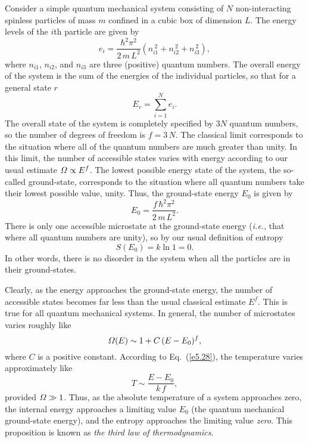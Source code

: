 Consider a simple quantum mechanical system consisting of $N$ non-interacting 
spinless particles of mass $m$ confined in a cubic box of dimension $L$. 
The energy levels of the $i$th particle are given by
\begin{equation}
e_i = \frac{\hbar^2 \pi^2}{2\,m \,L^2} \left(n_{i1}^{~2}+n_{i2}^{~2}+ n_{i3}^{~2}\right),
\end{equation}
where $n_{i1}$, $n_{i2}$, and $n_{i3}$ are three (positive) quantum numbers. The 
overall energy of the system is the sum of the energies of the individual particles,
so that for a general state $r$
\begin{equation}
E_r = \sum_{i=1}^N e_i.
\end{equation}
The overall state of the system is completely
specified by $3N$ quantum  numbers, so the number
of degrees of freedom is $f=3\,N$. The classical limit corresponds to the situation
where all of the quantum numbers are much greater than unity. In this limit, the
number of accessible states varies with energy according to our usual estimate
${\mit\Omega} \propto E^f$. The lowest possible energy state of the system, the 
so-called ground-state, corresponds to the situation where all quantum numbers
take their lowest possible value, unity. Thus, the ground-state energy $E_0$ is
given by 
\begin{equation}
E_0 = \frac{ f\,\hbar^2 \pi^2}{2\,m\, L^2}.
\end{equation}
There is only one accessible microstate at the ground-state energy ({\em i.e.},
that where all quantum numbers are unity), so by our usual definition of
entropy
\begin{equation}
S(E_0) = k\ln 1 = 0.
\end{equation}
In other words, there is no disorder in the system when all the particles are in their
ground-states. 

Clearly, as the energy approaches  the ground-state energy,
the number of accessible states becomes far less than
the usual classical estimate $E^f$. This is true for all quantum mechanical systems.
In general, the number of microstates
varies roughly like
\begin{equation}
{\mit\Omega}(E) \sim 1 + C \,(E - E_0)^f,
\end{equation}
where $C$ is a positive constant.
According to Eq.~(\ref{e5.28}), the temperature varies approximately like
\begin{equation}
T \sim \frac{E - E_0}{k\,f},
\end{equation}
provided ${\mit\Omega} \gg 1$. Thus, as the absolute temperature of a system
approaches zero, the internal energy approaches a limiting value $E_0$ (the
quantum mechanical ground-state energy), and the entropy approaches the limiting
value {\em zero}.
 This proposition is known as {\em the third law of thermodynamics}.

